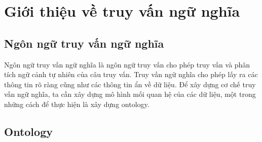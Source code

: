 

\section{Giới thiệu về truy vấn ngữ nghĩa}
\subsection{Ngôn ngữ truy vấn ngữ nghĩa}
Ngôn ngữ truy vấn ngữ nghĩa là ngôn ngữ truy vấn cho phép truy vấn và phân tích ngữ cảnh tự nhiên của câu truy vấn. Truy vấn ngữ nghĩa cho phép lấy ra các thông tin rõ ràng cũng như các thông tin ẩn về dữ liệu. Để xây dựng cơ chế truy vấn ngữ nghĩa, ta cần xây dựng mô hình mối quan hệ của các dữ liệu, một trong những cách để thực hiện là xây dựng ontology.

\subsection{Ontology}
